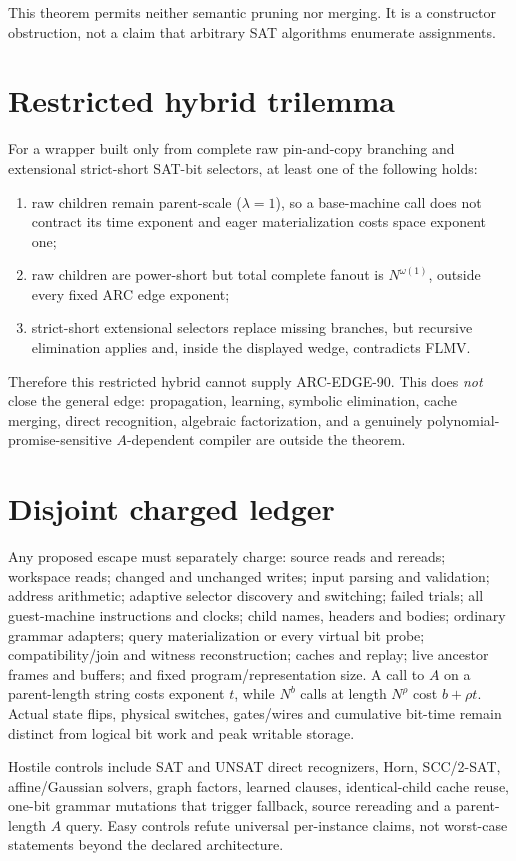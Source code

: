 \documentclass[11pt]{article}
\begin{document}
This theorem permits neither semantic pruning nor merging.  It is a constructor
obstruction, not a claim that arbitrary SAT algorithms enumerate assignments.

\section{Restricted hybrid trilemma}
For a wrapper built only from complete raw pin-and-copy branching and
extensional strict-short SAT-bit selectors, at least one of the following holds:
\begin{enumerate}
\item raw children remain parent-scale ($\lambda=1$), so a base-machine call
does not contract its time exponent and eager materialization costs space
exponent one;
\item raw children are power-short but total complete fanout is
$N^{\omega(1)}$, outside every fixed ARC edge exponent;
\item strict-short extensional selectors replace missing branches, but recursive
elimination applies and, inside the displayed wedge, contradicts FLMV.
\end{enumerate}
Therefore this restricted hybrid cannot supply ARC-EDGE-90.  This does
\emph{not} close the general edge: propagation, learning, symbolic elimination,
cache merging, direct recognition, algebraic factorization, and a genuinely
polynomial-promise-sensitive $A$-dependent compiler are outside the theorem.

\section{Disjoint charged ledger}
Any proposed escape must separately charge: source reads and rereads;
workspace reads; changed and unchanged writes; input parsing and validation;
address arithmetic; adaptive selector discovery and switching; failed trials;
all guest-machine instructions and clocks; child names, headers and bodies;
ordinary grammar adapters; query materialization or every virtual bit probe;
compatibility/join and witness reconstruction; caches and replay; live ancestor
frames and buffers; and fixed program/representation size.  A call to $A$ on a
parent-length string costs exponent $t$, while $N^b$ calls at length $N^\rho$
cost $b+\rho t$.  Actual state flips, physical switches, gates/wires and
cumulative bit-time remain distinct from logical bit work and peak writable
storage.

Hostile controls include SAT and UNSAT direct recognizers, Horn, SCC/2-SAT,
affine/Gaussian solvers, graph factors, learned clauses, identical-child cache
reuse, one-bit grammar mutations that trigger fallback, source rereading and a
parent-length $A$ query.  Easy controls refute universal per-instance claims,
not worst-case statements beyond the declared architecture.
\end{document}
